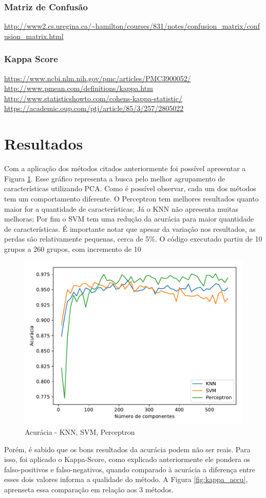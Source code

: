\documentclass[12pt]{article}
\begin{document}
	\subsubsection{Matriz de Confusão}
	
		\url{http://www2.cs.uregina.ca/~hamilton/courses/831/notes/confusion_matrix/confusion_matrix.html}\\
		
	\subsubsection{Kappa Score}
	
		\url{https://www.ncbi.nlm.nih.gov/pmc/articles/PMC3900052/}\\
		\url{http://www.pmean.com/definitions/kappa.htm}\\
		\url{http://www.statisticshowto.com/cohens-kappa-statistic/}\\
		\url{https://academic.oup.com/ptj/article/85/3/257/2805022}
		
\section{Resultados}
	Com a aplicação dos métodos citados anteriormente foi possível apresentar a Figura \ref{fig:todos}. Esse gráfico representa a busca pelo melhor agrupamento de características utilizando PCA. Como é possível observar, cada um dos métodos tem um comportamento diferente. O Perceptron tem melhores resultados quanto maior for a quantidade de características; Já o KNN não apresenta muitas melhoras; Por fim o SVM tem uma redução da acurácia para maior quantidade de características. É importante notar que apesar da variação nos resultados, as perdas são relativamente pequenas, cerca de 5\%. O código executado partiu de 10 grupos a 260 grupos, com incremento de 10
	\begin{figure}[!htb]
	\centering
	\includegraphics[width=.5\textwidth]{Todos.pdf}
	\caption{Acurácia - KNN, SVM, Perceptron}
	\label{fig:todos}
	\end{figure}
	Porém, é sabido que os bons resultados da acurácia podem não ser reais. Para isso, foi aplicado o Kappa-Score, como explicado anteriormente ele pondera os falso-positivos e falso-negativos, quando comparado à acurácia a diferença entre esses dois valores informa a qualidade do método. A Figura \ref{fig:kappa_accu}, aprenseta essa comparação em relação aos 3 métodos.
\end{document}
